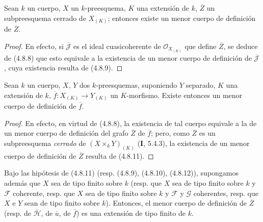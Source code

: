 \begin{corollary}[4.8.11]
\label{IV.2.4.8.11-fr}
Sean $k$ un cuerpo, $X$ un $k$-preesquema, $K$ una extensión de $k$,
$\overline Z$ un subpreesquema cerrado de $X_{(K)}$; entonces existe un
menor cuerpo de definición de $\overline Z$.
\end{corollary}

\begin{proof}
En efecto, si $\overline{\mathscr J}$ es el ideal cuasicoherente de
$\mathcal O_{X_{(K)}}$ que define $\overline Z$, se deduce de (4.8.8) que
esto equivale a la existencia de un menor cuerpo de definición de
$\overline{\mathscr J}$, cuya existencia resulta de (4.8.9).
\end{proof}

\begin{corollary}[4.8.12]
\label{IV.2.4.8.12-fr}
Sean $k$ un cuerpo, $X$, $Y$ dos $k$-preesquemas, suponiendo $Y$ separado,
$K$ una extensión de $k$, $\overline f:X_{(K)}\to Y_{(K)}$ un $K$-morfismo.
Existe entonces un menor cuerpo de definición de $\overline f$.
\end{corollary}

\begin{proof}
En efecto, en virtud de (4.8.8), la existencia de tal cuerpo equivale a la de
un menor cuerpo de definición del grafo $\overline Z$ de $\overline f$; pero,
como $\overline Z$ es un subpreesquema \emph{cerrado} de
$(X\times_kY)_{(K)}$ (\textbf I, 5.4.3), la existencia de un menor cuerpo de
definición de $\overline Z$ resulta de (4.8.11).
\end{proof}

\begin{proposition}[4.8.13]
\label{IV.2.4.8.13-fr}
Bajo las hipótesis de \textup{(4.8.11) (resp. (4.8.9), (4.8.10), (4.8.12))},
supongamos además que $X$ sea de tipo finito sobre $k$ \textup{(resp.} que $X$ sea de
tipo finito sobre $k$ y $\mathscr F$ coherente, \textup{resp.} que $X$ sea de tipo
finito sobre $k$ y $\mathscr F$ y $\mathscr G$ coherentes, \textup{resp.} que $X$ e $Y$
sean de tipo finito sobre $k$\textup{)}. Entonces, el menor cuerpo de definición de
$\overline Z$ \textup{(resp.} de $\overline{\mathscr H}$, de $\overline u$, de $\overline f$\textup{)} es
una extensión de tipo finito de $k$.
\end{proposition}

